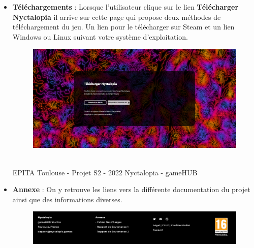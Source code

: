 \begin{itemize}
    \item \textbf{Téléchargements} : Lorsque l'utilisateur clique sur le lien \textbf{Télécharger Nyctalopia} il arrive sur cette page qui propose deux méthodes de téléchargement du jeu. Un lien pour le télécharger sur Steam et un lien Windows ou Linux suivant votre système d'exploitation.
    \newline

\begin{figure}[H]
\centering
\begin{minipage}{.5\textwidth}
  \centering
  \centerline{\includegraphics[width=1\linewidth]{img/7.PNG}}
  \label{fig:faq}
\end{minipage}%
\end{figure}


\vfill
\noindent\makebox[\linewidth]{\rule{.8\paperwidth}{.6pt}}\\[0.2cm]
EPITA Toulouse - Projet S2 - 2022 \hfill Nyctalopia - gameHUB
\noindent\makebox[\linewidth]{\rule{.8\paperwidth}{.6pt}}
\newpage


    \item \textbf{Annexe} : On y retrouve les liens vers la différente documentation du projet ainsi que des informations diverses.
    
\begin{figure}[H]
\centering
\begin{minipage}{.5\textwidth}
  \centering
  \centerline{\includegraphics[width=1\linewidth]{img/uwufolder/annexe.png}}
  \label{fig:faq}
\end{minipage}%
\end{figure}
\end{itemize}

